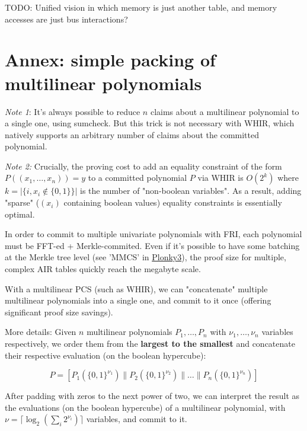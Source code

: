 \documentclass{article}
\theoremstyle{definition}
\begin{document}
\vspace{3mm} TODO: Unified vision in which memory is just another table, and memory accesses are just bus interactions?

\section{Annex: simple packing of multilinear polynomials}

\textit{Note 1}: It's always possible to reduce $n$ claims about a multilinear polynomial to a single one, using sumcheck. But this trick is not necessary with WHIR, which natively supports an arbitrary number of claims about the committed polynomial.
\vspace{3mm}

\textit{Note 2:} Crucially, the proving cost to add an equality constraint of the form $P((x_1, \dots, x_n)) = y$ to a committed polynomial $P$ via WHIR is $O(2^k)$ where $k = {|\{i, x_i \notin \{0, 1\} \}|}$ is the number of "non-boolean variables". As a result, adding "sparse" ($(x_i)$ containing boolean values) equality constraints is essentially optimal.

\vspace{3mm}

In order to commit to multiple univariate polynomials with FRI, each polynomial must be FFT-ed + Merkle-commited.
Even if it's possible to have some batching at the Merkle tree level (see 'MMCS' in \href{https://github.com/Plonky3/Plonky3}{Plonky3}), the proof size for multiple, complex AIR tables quickly reach the megabyte scale.

With a multilinear PCS (such as WHIR), we can "concatenate" multiple multilinear polynomials into a single one, and commit to it once (offering significant proof size savings).

\vspace{5mm}

More details: Given $n$ multilinear polynomials $P_1, \dots, P_n$ with $\nu_1, \dots, \nu_n$ variables respectively, we order them from the \textbf{largest to the smallest} and concatenate their respective evaluation (on the boolean hypercube):

$$P = [P_1(\{0,1\}^{\nu_1}) \| P_2(\{0,1\}^{\nu_2}) \| \dots \| P_n(\{0,1\}^{\nu_n})]$$

After padding with zeros to the next power of two, we can interpret the result as the evaluations (on the boolean hypercube) of a multilinear polynomial, with $\nu = \lceil \log_2(\sum_i 2^{\nu_i}) \rceil$ variables, and commit to it.
\end{document}
